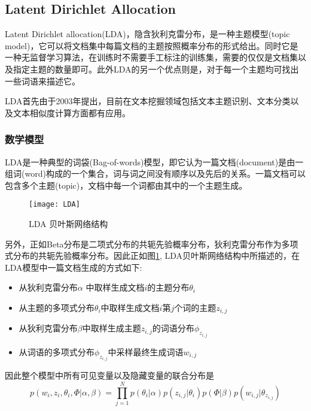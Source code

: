 \subsection{Latent Dirichlet Allocation}
Latent Dirichlet allocation(LDA)，隐含狄利克雷分布，是一种主题模型(topic model)，它可以将文档集中每篇文档的主题按照概率分布的形式给出。同时它是一种无监督学习算法，在训练时不需要手工标注的训练集，需要的仅仅是文档集以及指定主题的数量即可。此外LDA的另一个优点则是，对于每一个主题均可找出一些词语来描述它。

LDA首先由于2003年提出，目前在文本挖掘领域包括文本主题识别、文本分类以及文本相似度计算方面都有应用。


\subsubsection{数学模型}
LDA是一种典型的词袋(Bag-of-words)模型，即它认为一篇文档(document)是由一组词(word)构成的一个集合，词与词之间没有顺序以及先后的关系。一篇文档可以包含多个主题(topic)，文档中每一个词都由其中的一个主题生成。

\begin{figure}[htbp]
	\begin{center}
		\texttt{[image: LDA]}
		\caption{LDA 贝叶斯网络结构}
		\label{gra4}
	\end{center}
\end{figure}

另外，正如Beta分布是二项式分布的共轭先验概率分布，狄利克雷分布作为多项式分布的共轭先验概率分布。因此正如图\ref{gra4}, LDA贝叶斯网络结构中所描述的，在LDA模型中一篇文档生成的方式如下:
\begin{itemize}
	\item 从狄利克雷分布$\alpha$ 中取样生成文档$i$的主题分布$\theta_i$
	\item 从主题的多项式分布$\theta_i$中取样生成文档$i$第$j$个词的主题$z_{i, j}$
	\item 从狄利克雷分布$\beta $中取样生成主题$z_{i, j}$的词语分布$\phi_{z_{i, j}}$
	\item 从词语的多项式分布$\phi_{z_{i, j}}$中采样最终生成词语$w_{i, j}$
\end{itemize}
因此整个模型中所有可见变量以及隐藏变量的联合分布是
\begin{equation}
p(w_i, z_i, \theta_i, \Phi | \alpha, \beta) = \prod_{j = 1}^{N} p(\theta_i|\alpha)p(z_{i, j}|\theta_i)p(\Phi|\beta)p(w_{i, j}|\theta_{z_{i, j}})
\end{equation}



